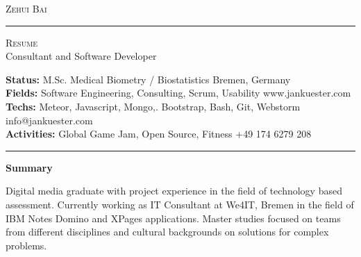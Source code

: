 \documentclass[10pt,A4]{article}
\newcommand{\cvsection}[1]
{
	\begin{center}
		\large\textcolor{sectcol}{\textbf{#1}}
	\end{center}
}
\newcommand{\metasection}[2]
{
\footnotesize{#2} \hspace*{\fill} \footnotesize{#1}\\[1pt]
}
\begin{document}
\pagestyle{fancy}	








\vspace{-8pt}
\begin{center}
	\HUGE \textsc{Zehui Bai} \textcolor{sectcol}{\rule[-1mm]{1mm}{0.9cm}} \textsc{Resume}\\[2pt]
	\small Consultant and Software Developer
\end{center}



\vspace{6pt}


\metasection{Bremen, Germany}{\textbf{Status:} M.Sc. Medical Biometry / Biostatistics}
\metasection{www.jankuester.com}{\textbf{Fields:} Software Engineering, Consulting, Scrum, Usability} 
\metasection{info@jankuester.com}{\textbf{Techs:} Meteor, Javascript, Mongo,. Bootstrap, Bash, Git, Webstorm}
\metasection{+49 174 6279 208}{\textbf{Activities:} Global Game Jam, Open Source, Fitness}
\vspace{-2pt}
\textcolor{softcol}{\hrule}
\vspace{6pt}

\normalsize

\vspace{-6pt}
\cvsection{Summary}
Digital media graduate with project experience in the field of technology based assessment. Currently working as IT Consultant at We4IT, Bremen in the field of IBM Notes Domino and XPages applications. Master studies focused on teams from different disciplines and cultural backgrounds on solutions for complex problems.\\
\end{document}
